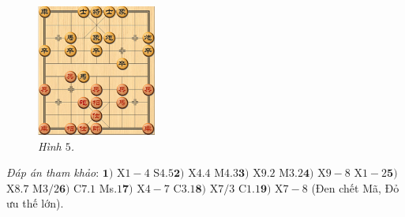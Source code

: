 \begin{multicols}{2}
	\begin{figure}[H]
		\vspace*{-5pt}
		\centering
		\captionsetup{labelformat= empty, justification=centering}
		\includegraphics[width= 0.35\textwidth]{5}
		\caption{\small\textit{\color{gocco}Hình $5$.}}
		\vspace*{-10pt}
	\end{figure}
	\textit{Đáp án tham khảo}: $\pmb{1)}$ X$1-4$ S$4.5$\quad  $\pmb{2)}$ X$4.4$ M$4.3$\quad $\pmb{3)}$ X$9.2$ M$3.2$\quad $\pmb{4)}$ X$9-8$ X$1-2$\quad $\pmb{5)}$ X$8.7$ M$3/2$\quad $\pmb{6)}$ C$7.1$ Ms$.1$\quad $\pmb{7)}$ X$4-7$ C$3.1$\quad  $\pmb{8)}$ X$7/3$ C$1.1$\quad $\pmb{9)}$ X$7-8$ (Đen chết Mã, Đỏ ưu thế lớn).	
\end{multicols}




